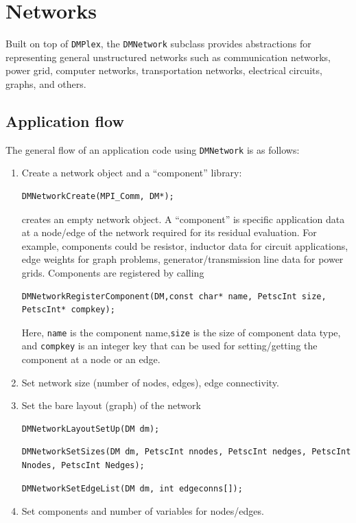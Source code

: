 \section{Networks}
Built on top of \lstinline{DMPlex}, the \lstinline{DMNetwork} subclass provides abstractions for representing general unstructured
networks such as communication networks, power grid, computer networks, transportation networks, electrical circuits, graphs, and others.

\subsection{Application flow}
The general flow of an application code using \lstinline{DMNetwork} is as follows:

\begin{enumerate}
  \item Create a network object and a ``component'' library:
\begin{lstlisting}
DMNetworkCreate(MPI_Comm, DM*);
\end{lstlisting}
  creates an empty network object. A ``component'' is specific application data at a node/edge of the network required for its residual evaluation. For example, components could be resistor, inductor data for circuit applications, edge weights for graph problems, generator/transmission line data for power grids. Components are registered by calling
\begin{lstlisting}
DMNetworkRegisterComponent(DM,const char* name, PetscInt size, PetscInt* compkey);
\end{lstlisting}
  Here, \lstinline{name} is the component name,\lstinline{size} is the size of component data type, and \lstinline{compkey} is an integer key that can be used for
  setting/getting the component at a node or an edge.
  \item Set network size (number of nodes, edges), edge connectivity.
  \item Set the bare layout (graph) of the network
\begin{lstlisting}
DMNetworkLayoutSetUp(DM dm);
\end{lstlisting}
\begin{lstlisting}
DMNetworkSetSizes(DM dm, PetscInt nnodes, PetscInt nedges, PetscInt Nnodes, PetscInt Nedges);
\end{lstlisting}
\begin{lstlisting}
DMNetworkSetEdgeList(DM dm, int edgeconns[]);
\end{lstlisting}
  \item Set components and number of variables for nodes/edges.

\end{enumerate}
